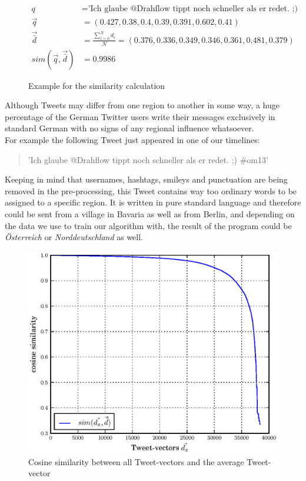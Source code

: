 \documentclass[./Main.tex]{subfiles}
\begin{document}
\begin{figure}[b]
 \begin{align*}
  q &= \textrm{'Ich glaube @Drahflow tippt noch schneller als er redet. ;) \#om13' } \\
  \vec{q} &= (0.427, 0.38, 0.4, 0.39, 0.391, 0.602,  0.41) \\ 
   \vec{\bar{d}} &= \frac{\sum^N_{i=0} d_i}{N} =  (0.376, 0.336, 0.349, 0.346, 0.361, 0.481,  0.379) \\
  sim(\vec{q}, \vec{\bar{d}}) &= 0.9986 
\end{align*}
  \caption{Example for the similarity calculation}
  \label{cos_sim_example}
\end{figure}
Although Tweets may differ from one region to another in some way, a huge percentage of the German Twitter users write their messages exclusively in standard German with no signs of any regional influence whatsoever. \\
For example the following Tweet just appeared in one of our timelines:
\begin{quote}
'Ich glaube @Drahflow tippt noch schneller als er redet. ;) \#om13'
\end{quote}
Keeping in mind that usernames, hashtags, smileys and punctuation are being removed in the pre-processing, this Tweet contains way too ordinary words to be assigned to a specific region. It is written in pure standard language and therefore could be sent from a village in Bavaria as well as from Berlin, and depending on the data we use to train our algorithm with, the result of the program could be \textit{Österreich} or \textit{Norddeutschland} as well.

\begin{figure}[t]
  \begin{center}
   \includegraphics[width=\columnwidth]{../img/cos-verteilung.eps}
    \caption{\label{cos_distribution} Cosine similarity between all Tweet-vectors and the average Tweet-vector}
  \end{center}
\end{figure}
\end{document}

